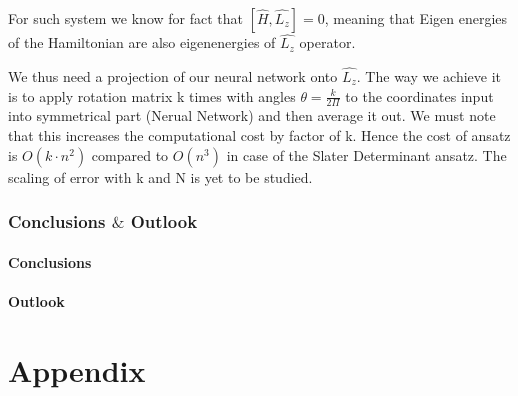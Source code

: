 \documentclass[a4paper,11pt,twoside]{article}
\begin{document}
For such system we know for fact that $ [\hat{H}, \hat{L_z}] = 0$, meaning that Eigen energies of the Hamiltonian are also eigenenergies of $\hat{L_z}$ operator. 

We thus need a projection of our neural network onto $\hat{L_z}$. The way we achieve it is to apply rotation matrix k times with angles $ \theta = \frac{k}{2 \Pi}$  to the coordinates input into symmetrical part (Nerual Network) and then average it out. We must note that this increases the computational cost by factor of k. Hence the cost of ansatz is $O(k \cdot n^2 )$ compared to $O( n^3)$ in case of the Slater Determinant ansatz. The scaling of error with k and N is yet to be studied. 




\newpage

\section{Conclusions $\&$ Outlook}
\subsection*{Conclusions}
\subsection*{Outlook}
\newpage
\part{Appendix}


\end{document}
